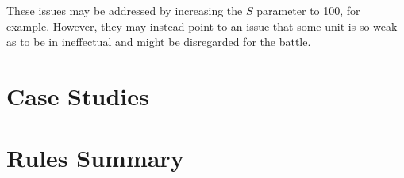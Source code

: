 \documentclass[twocolumn]{article}
\begin{document}
These issues may be addressed by increasing the $S$ parameter to 100,
for example.
However, they may instead point to an issue that some unit
is so weak as to be in ineffectual and might be disregarded for the battle.

\section{Case Studies}

\section{Rules Summary}
\end{document}
